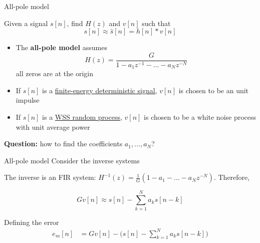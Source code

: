 \documentclass[10pt]{beamer}
\begin{document}
\begin{frame}{All-pole model}
	\begin{center}
	\resizebox{0.5\linewidth}{!}{}
	\end{center}
	
	Given a signal $s[n]$, find $H(z)$ and $v[n]$ such that 
	\begin{equation*}
		s[n] \approx \hat{s}[n] = h[n] \ast v[n]
	\end{equation*}
	
	\begin{itemize}
		\item The \textbf{all-pole model} assumes
		\begin{equation*}
			H(z) = \frac{G}{1 - a_1z^{-1} - \ldots - a_{N}z^{-N}}
		\end{equation*}
		all zeros are at the origin
		\item If $s[n]$ is a \underline{finite-energy deterministic signal}, $v[n]$ is chosen to be an unit impulse
		\item If $s[n]$ is a \underline{WSS random process}, $v[n]$ is chosen to be a white noise process with unit average power
	\end{itemize}

	\textbf{Question:} how to find the coefficients $a_1, \ldots, a_N$?
\end{frame}


\begin{frame}{All-pole model}
Consider the inverse systems
\begin{center}
	\def\INVERSE{1}
	\resizebox{0.9\linewidth}{!}{}
\end{center}

The inverse is an FIR system: $H^{-1}(z) = \frac{1}{G}(1 - a_1 - \ldots - a_Nz^{-N})$. Therefore,

\begin{equation*}
Gv[n] \approx s[n] - \sum_{k = 1}^N a_ks[n-k]
\end{equation*}

Defining the error
\begin{align*}
e_m[n] &= Gv[n] - \Big(s[n] - \sum_{k = 1}^N a_ks[n-k]\Big) \tag{modeling error} \\
\end{align*}

\end{frame}
\end{document}
